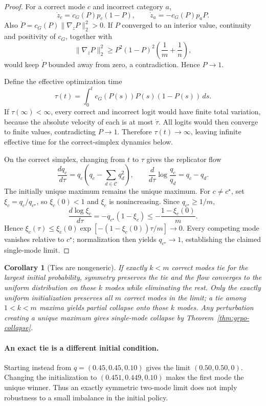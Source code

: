 \documentclass{article}
\newcommand{\1}{\mathbf 1}
\newtheorem{corollary}[lemma]{Corollary}
\theoremstyle{remark}
\theoremstyle{definition}
\theoremstyle{plain}
\begin{document}
\begin{proof}
For a correct mode $c$ and incorrect category $a$,
\[
  \dot z_c=c_G(P)p_c(1-P),
  \qquad
  \dot z_a=-c_G(P)p_aP.
\]
Also $\dot P=c_G(P)\lVert\nabla_zP\rVert_2^2>0$. If $P$ converged to an
interior value, continuity and positivity of $c_G$, together with
\[
 \lVert\nabla_zP\rVert_2^2
 \ge P^2(1-P)^2\left(\frac1m+\frac1n\right),
\]
would keep $\dot P$ bounded away from zero, a contradiction. Hence $P\to1$.

Define the effective optimization time
\[
  \tau(t)=\int_0^t c_G(P(s))P(s)(1-P(s))\,ds.
\]
If $\tau(\infty)<\infty$, every correct and incorrect logit would have finite
total variation, because the absolute velocity of each is at most $\dot\tau$.
All logits would then converge to finite values, contradicting $P\to1$.
Therefore $\tau(t)\to\infty$, leaving infinite effective time for the
correct-simplex dynamics below.

On the correct simplex, changing from $t$ to $\tau$ gives the replicator flow
\begin{equation}
  \frac{dq_c}{d\tau}
  =q_c\left(q_c-\sum_{d\in\mathcal C}q_d^2\right),
  \qquad
  \frac{d}{d\tau}\log\frac{q_c}{q_d}=q_c-q_d.
  \label{eq:grpo-replicator}
\end{equation}
The initially unique maximum remains the unique maximum. For $c\ne c^\star$,
set $\xi_c=q_c/q_{c^\star}$, so $\xi_c(0)<1$ and $\xi_c$ is nonincreasing.
Since $q_{c^\star}\ge1/m$,
\[
 \frac{d\log\xi_c}{d\tau}
 =-q_{c^\star}(1-\xi_c)
 \le-\frac{1-\xi_c(0)}{m}.
\]
Hence $\xi_c(\tau)\le\xi_c(0)\exp[-(1-\xi_c(0))\tau/m]\to0$.
Every competing mode vanishes relative to $c^\star$; normalization then
yields $q_{c^\star}\to1$, establishing the claimed single-mode limit.
\end{proof}

\begin{corollary}[Ties are nongeneric]
\label{cor:grpo-ties}
If exactly $k<m$ correct modes tie for the largest initial probability, symmetry
preserves the tie and the flow converges to the uniform distribution on those
$k$ modes while eliminating the rest. Only the exactly uniform initialization preserves all $m$ correct modes
in the limit; a tie among $1<k<m$ maxima yields partial collapse onto those
$k$ modes. Any perturbation creating a unique maximum gives single-mode
collapse by Theorem~\ref{thm:grpo-collapse}.
\end{corollary}

\paragraph{An exact tie is a different initial condition.}
Starting instead from $q=(0.45,0.45,0.10)$ gives the limit
$(0.50,0.50,0)$. Changing the initialization to $(0.451,0.449,0.10)$ makes
the first mode the unique winner. Thus an exactly symmetric two-mode limit
does not imply robustness to a small imbalance in the initial policy.
\end{document}
